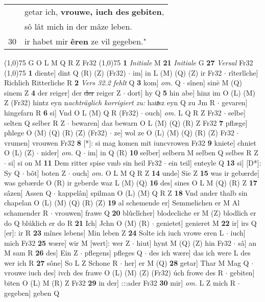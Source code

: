 \documentclass[8pt,a4paper,notitlepage]{article}
\begin{document}
\begin{table}[ht]
\begin{minipage}[t]{0.5\linewidth}
\begin{tabular}{rl}
 & getar ich, \textbf{vrouwe, iuch des} \textbf{gebiten},\\ 
 & sô lât mich in der mâze leben.\\ 
30 & ir habet mir \textbf{êren} ze vil gegeben."\\ 
\end{tabular}
\scriptsize
\line(1,0){75} \newline
G O L M Q R Z Fr32 \newline
\line(1,0){75} \newline
\textbf{1} \textit{Initiale} M  \textbf{21} \textit{Initiale} G  \textbf{27} \textit{Versal} Fr32  \newline
\line(1,0){75} \newline
\textbf{1} diente] dint Q (R) (Z) (Fr32)  $\cdot$ im] in L (M) (Q) (Z) ir Fr32  $\cdot$ rîterlîche] Richlich Ritterliche R \textbf{2} \textit{Vers 32.2 fehlt} Q  \textbf{3} kom] \textit{om.} Q  $\cdot$ sînen] sinē M (Q) sinem Z \textbf{4} der reiger] der \sout{der} reiger Z  $\cdot$ dort] hy Q \textbf{5} hin abe] hinz im O (L) (M) Z (Fr32) hintz eyn n\textit{achträglich korrigiert zu: }hauͯsz eyn Q zu Jm R  $\cdot$ gevaren] hingefarn R \textbf{6} si] Vnd O L (M) Q R (Fr32)  $\cdot$ ouch] \textit{om.} L Q R Z Fr32  $\cdot$ selbe] selten Q selber R Z  $\cdot$ bewaren] daz bewarn O L (M) (Q) (R) Z Fr32 \textbf{7} pflæge] phlege O (M) (Q) (R) (Z) (Fr32)  $\cdot$ ze] wol ze O (L) (M) (Q) (R) (Z) Fr32  $\cdot$ vrumen] vrouwen Fr32 \textbf{8} [*]: si mag komen mit iuncvrowen Fr32 \textbf{9} kniete] chniet O (L) (Z)  $\cdot$ nider] \textit{om.} Q  $\cdot$ im] in Q (R) \textbf{10} selber] selbern M selben Q selbes R Z  $\cdot$ si] si on M \textbf{11} Dem ritter spise vmb sin heil Fr32  $\cdot$ ein teil] enteyle Q \textbf{13} si] [D*]: Sy Q  $\cdot$ bôt] boten Z  $\cdot$ ouch] \textit{om.} O L M Q R Z \textbf{14} unde] Sie Z \textbf{15} was ir gebærde] was gebærde O (R) ir geberde waz L (M) (Q) \textbf{16} des] sines O L M (Q) (R) Z \textbf{17} sâzen] Assen Q  $\cdot$ kappelân] spilman O (L) (M) Q R Z \textbf{18} Vnd ander thalb sin chapelan O (L) (M) (Q) (R) (Z) \textbf{19} al schemende er] Semmelichen er M Al schamender R  $\cdot$ vrouwen] frawe Q \textbf{20} blûclîcher] blodecliche er M (Z) blodlich er do Q blúklich er do R \textbf{21} Ich] Jchn O (M) (R)  $\cdot$ genietet] genieret M \textbf{22} ir] irs Q [er]: ir R \textbf{23} mînes lebens] Min leben Z \textbf{24} Solte ich iuch vrowe eren L  $\cdot$ iuch] mich Fr32 \textbf{25} wære] wir M [wert]: wer Z  $\cdot$ hiut] hynt M (Q) (Z) hin Fr32  $\cdot$ sâ] an M sam R \textbf{26} des] Ein Z  $\cdot$ pflegens] pfleges Q  $\cdot$ des ich wære] das ich were L des wer ich R \textbf{27} sône] So L Z Schone R  $\cdot$ her] er M (Q) \textbf{28} getar] Thar M Mag Q  $\cdot$ vrouwe iuch des] ivch des frawe O (L) (M) (Z) (Fr32) úch frowe des R  $\cdot$ gebiten] biten O (L) M (R) Z Fr32 \textbf{29} in der] :::ader Fr32 \textbf{30} mir] \textit{om.} L Z mich R  $\cdot$ gegeben] geben Q \newline

\end{minipage}
\end{table}
\end{document}
